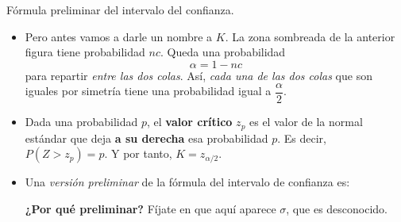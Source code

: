 \documentclass[
  9pt,
  ignorenonframetext,
]{beamer}
\begin{document}
\begin{frame}{Fórmula preliminar del intervalo del confianza.}
\protect\hypertarget{formula-preliminar-del-intervalo-del-confianza.}{}

\begin{itemize}
\item
  Pero antes vamos a darle un nombre a \(K\). La zona sombreada de la
  anterior figura tiene probabilidad \(nc\). Queda una probabilidad
  \[\alpha = 1 - nc\] para repartir \emph{entre las dos colas}. Así,
  \emph{cada una de las dos colas} que son iguales por simetría tiene
  una probabilidad igual a \(\dfrac{\alpha}{2}\).
\item
  Dada una probabilidad \(p\), el \textbf{valor crítico} \(z_p\) es el
  valor de la normal estándar que deja \textbf{a su derecha} esa
  probabilidad \(p\). Es decir, \(P(Z > z_p) = p\). Y por tanto,
  \(K = z_{\alpha/2}\).
\item
  Una \emph{versión preliminar} de la fórmula del intervalo de confianza
  es:

  \begin{center}
  \end{center}

  \textbf{¿Por qué preliminar?} Fíjate en que aquí aparece \(\sigma\),
  que es desconocido.
\end{itemize}

\end{frame}
\end{document}
